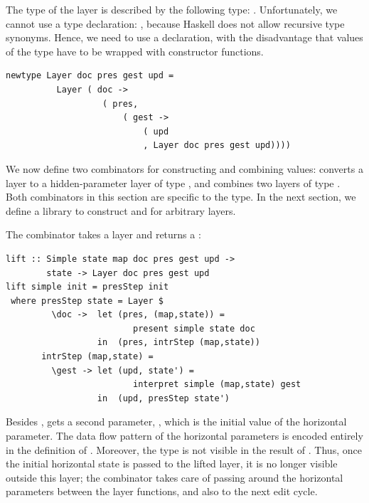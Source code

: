 \documentclass[preprint,natbib]{sigplanconf}
\begin{document}
The type of the layer is described by the following type: 
.  Unfortunately, we cannot use a type declaration: , because Haskell does not allow recursive type synonyms. Hence, we need to use a  declaration, with the disadvantage that values of the type have to be wrapped with constructor functions.

\begin{small}
\begin{verbatim}
newtype Layer doc pres gest upd = 
          Layer ( doc -> 
                   ( pres, 
                       ( gest -> 
                           ( upd 
                           , Layer doc pres gest upd))))
\end{verbatim}
\end{small}

We now define two combinators for constructing and combining  values:  converts  a  layer to a hidden-parameter layer of type , and  combines two layers of type . Both combinators in this section are specific to the  type. In the next section, we define a library to construct  and  for arbitrary layers.



The combinator  takes a  layer and returns a :

\begin{small}
\begin{verbatim}
lift :: Simple state map doc pres gest upd ->
        state -> Layer doc pres gest upd
lift simple init = presStep init 
 where presStep state = Layer $
         \doc ->  let (pres, (map,state)) = 
                         present simple state doc                                         
                  in  (pres, intrStep (map,state))
       intrStep (map,state) =
         \gest -> let (upd, state') = 
                         interpret simple (map,state) gest                     
                  in  (upd, presStep state')
\end{verbatim}%
\end{small}

Besides ,  gets a second parameter, , which is the initial value of the horizontal parameter. The data flow pattern of the horizontal parameters is encoded entirely in the definition of . Moreover, the  type is not visible in the result of . Thus, once the initial horizontal state is passed to the lifted layer, it is no longer visible outside this layer; the  combinator takes care of passing around the horizontal parameters between the layer functions, and also to the next edit cycle. 
\end{document}
